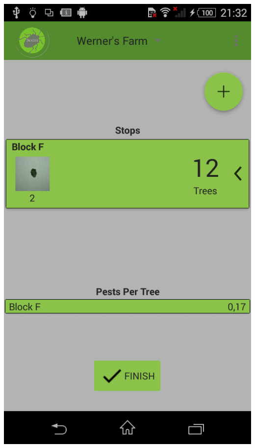\documentclass[11pt,a4paper,titlepage]{article}
\begin{document}
\begin{enumerate}
\begin{center}
				\includegraphics[scale=0.3]{scouttripfinal}
\end{center}


\end{enumerate}
\end{document}
